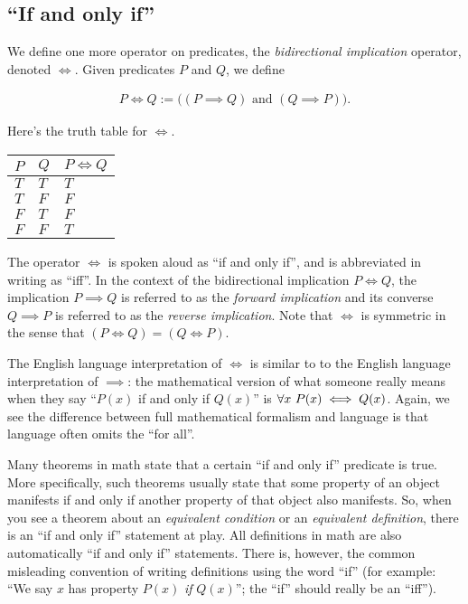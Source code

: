 \subsection*{``If and only if''}

We define one more operator on predicates, the \textit{bidirectional implication} operator, denoted $\iff$. Given predicates $P$ and $Q$, we define

\begin{align*}
    P \iff Q := \Big( (P \implies Q) \text{ and } (Q \implies P) \Big).
\end{align*}

Here's the truth table for $\iff$.

\begin{table}[H]
    \centering
    \begin{tabular}{|l|l|l|}
    \hline
    $P$ & $Q$ & $P \iff Q$ \\ \hline
    $T$ & $T$ & $T$        \\ \hline
    $T$ & $F$ & $F$        \\ \hline
    $F$ & $T$ & $F$        \\ \hline
    $F$ & $F$ & $T$        \\ \hline
    \end{tabular}
\end{table}

The operator $\iff$ is spoken aloud as ``if and only if'', and is abbreviated in writing as ``iff''. In the context of the bidirectional implication $P \iff Q$, the implication $P \implies Q$ is referred to as the \textit{forward implication} and its converse $Q \implies P$ is referred to as the \textit{reverse implication}. Note that $\iff$ is symmetric in the sense that $(P \iff Q) = (Q \iff P)$.

The English language interpretation of $\iff$ is similar to to the English language interpretation of $\implies$: the mathematical version of what someone really means when they say ``$P(x)$ if and only if $Q(x)$'' is $\forall x \text{ } P(x) \iff Q(x)$. Again, we see the difference between full mathematical formalism and language is that language often omits the ``for all''.

Many theorems in math state that a certain ``if and only if'' predicate is true. More specifically, such theorems usually state that some property of an object manifests if and only if another property of that object also manifests. So, when you see a theorem about an \textit{equivalent condition} or an \textit{equivalent definition}, there is an ``if and only if'' statement at play. All definitions in math are also automatically ``if and only if'' statements. There is, however, the common misleading convention of writing definitions using the word ``if'' (for example: ``We say $x$ has property $P(x)$ \textit{if} $Q(x)$''; the ``if'' should really be an ``iff'').

